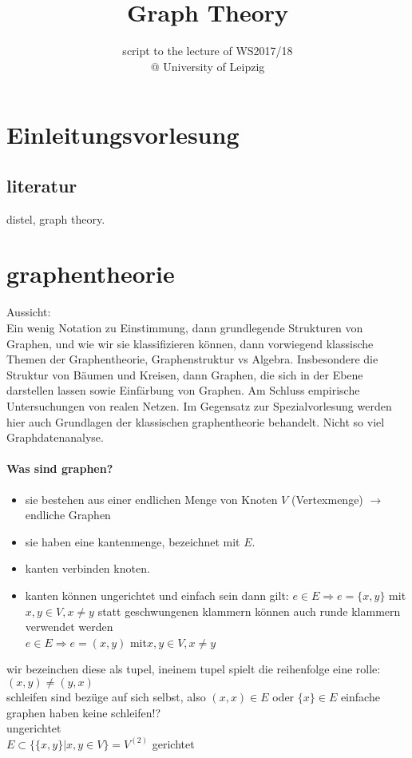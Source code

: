 \documentclass[a4paper]{article}
\title{\textbf{Graph Theory}}
\author{script to the lecture of  WS2017/18 \\
@ University of Leipzig}
\date{}
\theoremstyle{definition}
\theoremstyle{remark}
\begin{document}
\section{Einleitungsvorlesung}
\label{sec:einleitungsvorlesung}
\subsection{literatur}
\label{sub:literatur}
distel, graph theory.
\section{graphentheorie}
\label{sec:graphentheorie}
Aussicht:\\
Ein wenig Notation zu Einstimmung, dann grundlegende Strukturen von Graphen, und wie wir sie  klassifizieren können, 
dann vorwiegend klassische Themen der Graphentheorie, Graphenstruktur vs Algebra. Insbesondere die Struktur von Bäumen und Kreisen, dann Graphen, die sich in der Ebene darstellen lassen sowie Einfärbung von Graphen.
Am Schluss empirische Untersuchungen von realen Netzen.
Im Gegensatz zur Spezialvorlesung werden hier auch Grundlagen der klassischen graphentheorie behandelt. Nicht so viel Graphdatenanalyse.
 \paragraph{Was sind graphen?}%
 \label{par:was_sind_graphen_}
 \begin{itemize}
	 
	 \item sie bestehen aus einer endlichen Menge von Knoten $V$ (Vertexmenge) $\rightarrow $ endliche Graphen
	 \item sie haben eine kantenmenge, bezeichnet mit $E$.
	 \item kanten verbinden knoten.
	 \item kanten können ungerichtet und einfach sein dann gilt:
		$ e\in E \Rightarrow e=\{x,y\}$ mit $ x,y\in V, x\neq y$
statt geschwungenen klammern können auch runde klammern verwendet werden\\

$ e\in E \Rightarrow e=(x,y)$ mit$ x,y\in V, x\neq y$
 \end{itemize}
wir bezeinchen diese als tupel, ineinem tupel spielt die reihenfolge eine rolle: $(x,y)\neq(y,x)$\\
schleifen sind bezüge auf sich selbst, also $(x,x)\in E$ oder $\{x\}\in E$  einfache graphen haben keine schleifen!?\\
ungerichtet\\
$E\subset \{\{x,y\}|x,y\in V\}= V^{(2)}$
gerichtet
\end{document}
